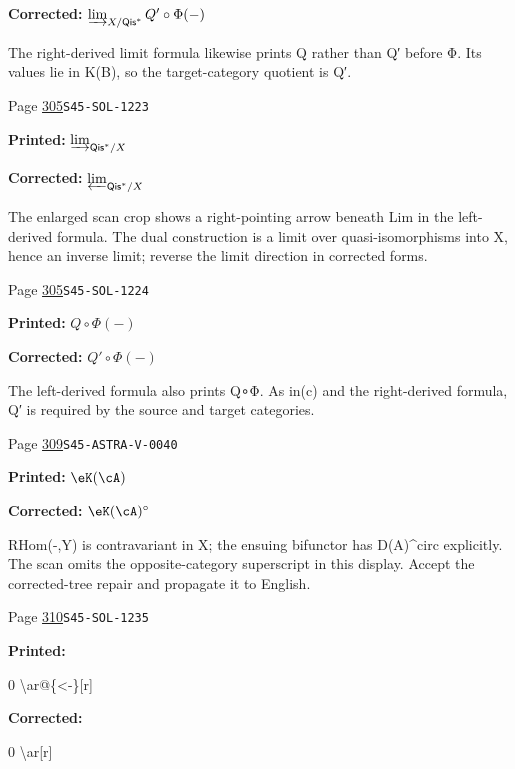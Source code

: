 \begin{description}
\par\noindent\textbf{Corrected:} \(\varinjlim_{X/\mathsf{Qis}^\ast} Q'\circ\Phi(-)\)
\par\noindent The right-derived limit formula likewise prints Q rather than Q′ before Φ. Its values lie in K(B), so the target-category quotient is Q′.
\smallskip
\item[\hypertarget{apparatus:EN-0213}{213}] Page \hyperlink{printpage:en:305}{305}\quad\texttt{S45-SOL-1223}
\par\noindent\textbf{Printed:} \(\varinjlim_{\mathsf{Qis}^\ast/X}\)
\par\noindent\textbf{Corrected:} \(\varprojlim_{\mathsf{Qis}^\ast/X}\)
\par\noindent The enlarged scan crop shows a right-pointing arrow beneath Lim in the left-derived formula. The dual construction is a limit over quasi-isomorphisms into X, hence an inverse limit; reverse the limit direction in corrected forms.
\smallskip
\item[\hypertarget{apparatus:EN-0214}{214}] Page \hyperlink{printpage:en:305}{305}\quad\texttt{S45-SOL-1224}
\par\noindent\textbf{Printed:} \(Q\circ \Phi(-)\)
\par\noindent\textbf{Corrected:} \(Q'\circ \Phi(-)\)
\par\noindent The left-derived formula also prints Q∘Φ. As in(c) and the right-derived formula, Q′ is required by the source and target categories.
\smallskip
\item[\hypertarget{apparatus:EN-0215}{215}] Page \hyperlink{printpage:en:309}{309}\quad\texttt{S45-ASTRA-V-0040}
\par\noindent\textbf{Printed:} \(\eK(\cA)\)
\par\noindent\textbf{Corrected:} \(\eK(\cA)^\circ\)
\par\noindent RHom(-,Y) is contravariant in X; the ensuing bifunctor has D(A)\textasciicircum{}circ explicitly. The scan omits the opposite-category superscript in this display. Accept the corrected-tree repair and propagate it to English.
\smallskip
\item[\hypertarget{apparatus:EN-0216}{216}] Page \hyperlink{printpage:en:310}{310}\quad\texttt{S45-SOL-1235}
\par\noindent\textbf{Printed:} {\footnotesize\ttfamily\raggedright 0 \textbackslash{}\allowbreak{}ar@\{\allowbreak{}<-\allowbreak{}\}\allowbreak{}[\allowbreak{}r]\allowbreak{}}
\par\noindent\textbf{Corrected:} {\footnotesize\ttfamily\raggedright 0 \textbackslash{}\allowbreak{}ar[\allowbreak{}r]\allowbreak{}}

\end{description}
